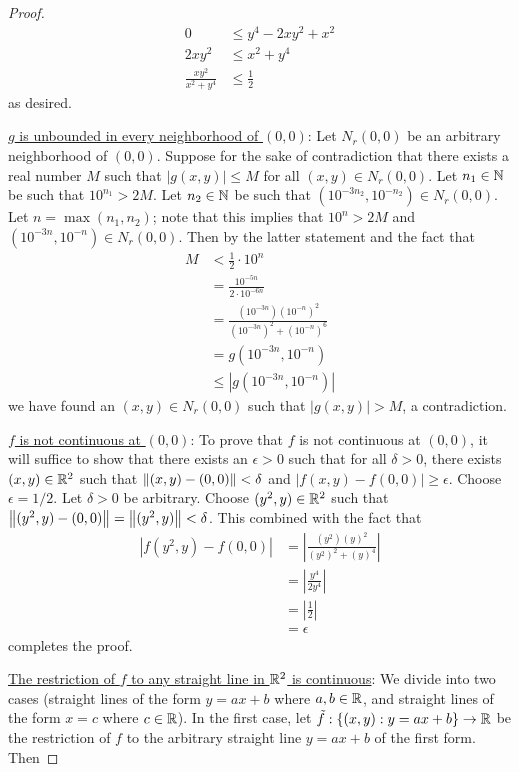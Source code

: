 \documentclass[../psets.tex]{subfiles}
\begin{document}
\begin{enumerate}[label={\textbf{\arabic*.}}]
\begin{proof}
\begin{align*}
            0 &\leq y^4-2xy^2+x^2\\
            2xy^2 &\leq x^2+y^4\\
            \frac{xy^2}{x^2+y^4} &\leq \frac{1}{2}
        \end{align*}
        as desired.\par\smallskip
        \underline{$g$ is unbounded in every neighborhood of $(0,0)$}: Let $N_r(0,0)$ be an arbitrary neighborhood of $(0,0)$. Suppose for the sake of contradiction that there exists a real number $M$ such that $|g(x,y)|\leq M$ for all $(x,y)\in N_r(0,0)$. Let $n_1\in\mathbb{N}$ be such that $10^{n_1}>2M$. Let $n_2\in\mathbb{N}$ be such that $(10^{-3n_2},10^{-n_2})\in N_r(0,0)$. Let $n=\max(n_1,n_2)$; note that this implies that $10^n>2M$ and $(10^{-3n},10^{-n})\in N_r(0,0)$. Then by the latter statement and the fact that
        \begin{align*}
            M &< \frac{1}{2}\cdot 10^n\\
            &= \frac{10^{-5n}}{2\cdot 10^{-6n}}\\
            &= \frac{(10^{-3n})(10^{-n})^2}{(10^{-3n})^2+(10^{-n})^6}\\
            &= g(10^{-3n},10^{-n})\\
            &\leq |g(10^{-3n},10^{-n})|
        \end{align*}
        we have found an $(x,y)\in N_r(0,0)$ such that $|g(x,y)|>M$, a contradiction.\par\smallskip
        \underline{$f$ is not continuous at $(0,0)$}: To prove that $f$ is not continuous at $(0,0)$, it will suffice to show that there exists an $\epsilon>0$ such that for all $\delta>0$, there exists $(x,y)\in\mathbb{R}^2$ such that $\norm{(x,y)-(0,0)}<\delta$ and $|f(x,y)-f(0,0)|\geq\epsilon$. Choose $\epsilon=1/2$. Let $\delta>0$ be arbitrary. Choose $(y^2,y)\in\mathbb{R}^2$ such that $\norm{(y^2,y)-(0,0)}=\norm{(y^2,y)}<\delta$. This combined with the fact that
        \begin{align*}
            |f(y^2,y)-f(0,0)| &= \left| \frac{(y^2)(y)^2}{(y^2)^2+(y)^4} \right|\\
            &= \left| \frac{y^4}{2y^4} \right|\\
            &= \left| \frac{1}{2} \right|\\
            &= \epsilon
        \end{align*}
        completes the proof.\par\smallskip
        \underline{The restriction of $f$ to any straight line in $\mathbb{R}^2$ is continuous}: We divide into two cases (straight lines of the form $y=ax+b$ where $a,b\in\mathbb{R}$, and straight lines of the form $x=c$ where $c\in\mathbb{R}$). In the first case, let $\tilde{f}:\{(x,y):y=ax+b\}\to\mathbb{R}$ be the restriction of $f$ to the arbitrary straight line $y=ax+b$ of the first form. Then

\end{proof}
\end{enumerate}
\end{document}
